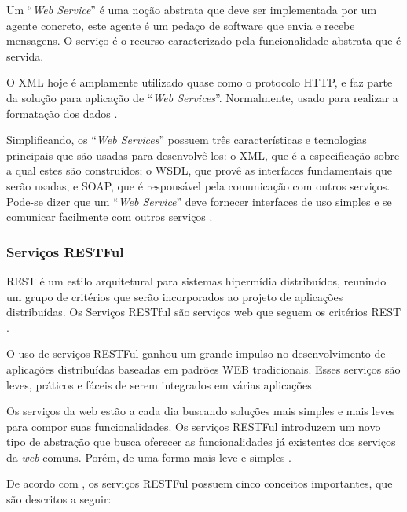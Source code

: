 Um ``\textit{Web Service}'' é uma noção abstrata que deve ser implementada por um agente concreto, este agente é um pedaço de software que envia e recebe mensagens. O serviço é o recurso caracterizado pela funcionalidade abstrata que é servida.

O XML hoje é amplamente utilizado quase como o protocolo HTTP, e faz parte da solução para aplicação de ``\textit{Web Services}''. Normalmente, usado para realizar a formatação dos dados \cite{Alonso:Casati:Kuno:Machiraju:2010}.

Simplificando, os ``\textit{Web Services}'' possuem três características e tecnologias principais que são usadas para desenvolvê-los: o XML, que é a especificação sobre a qual estes são construídos; o WSDL, que provê as interfaces fundamentais que serão usadas, e SOAP, que é responsável pela comunicação com outros serviços. Pode-se dizer que um ``\textit{Web Service}'' deve fornecer interfaces de uso simples e se comunicar facilmente com outros serviços \cite{Newcomer:Lomow:2004}.

\subsubsection{Serviços RESTFul}

REST é um estilo arquitetural para sistemas hipermídia distribuídos, reunindo um grupo de critérios que serão incorporados ao projeto de aplicações distribuídas. Os Serviços RESTful são serviços web que seguem os critérios REST \cite{Filho:2009}.

O uso de serviços RESTFul ganhou um grande impulso no desenvolvimento de aplicações distribuídas baseadas em padrões WEB tradicionais. Esses serviços são leves, práticos e fáceis de serem integrados em várias aplicações \cite{Rosenberg:Curbera:Duftler:Khalaf:2008}.

Os serviços da web estão a cada dia buscando soluções mais simples e mais leves para compor suas funcionalidades. Os serviços RESTFul introduzem um novo tipo de abstração que busca oferecer as funcionalidades já existentes dos serviços da \textit{web} comuns. Porém, de uma forma mais leve e simples \cite{Pautasso:2009}.

De acordo com \cite{Filho:2009}, os serviços RESTFul possuem cinco conceitos importantes, que são descritos a seguir:

